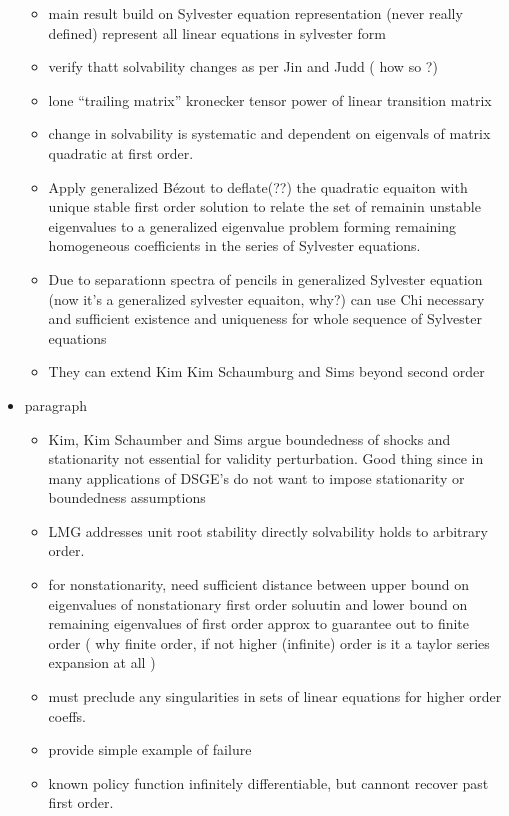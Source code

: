 \documentclass[12pt]{article}
\begin{document}
\begin{itemize}
\begin{itemize}
\item main result build on Sylvester equation representation  (never really defined)  represent all linear equations in sylvester form
\item verify thatt solvability changes  as per Jin and Judd ( how so ?)
\item lone ``trailing matrix'' kronecker tensor power of linear transition matrix
\item change in solvability is  systematic and dependent on eigenvals of matrix quadratic at first order.
\item Apply generalized B\'{e}zout to deflate(??) the quadratic equaiton with unique stable first order solution  to relate the set of remainin unstable eigenvalues to a generalized eigenvalue problem forming remaining homogeneous coefficients in the series of Sylvester equations.
\item Due to separationn spectra of pencils in generalized Sylvester equation  (now it's a generalized sylvester equaiton, why?) can use Chi necessary and sufficient existence and uniqueness for whole sequence of Sylvester equations
\item They can extend Kim Kim  Schaumburg and Sims beyond second order
\end{itemize}
\item paragraph


\begin{itemize}
\item Kim, Kim Schaumber and Sims argue boundedness of shocks and stationarity not essential for validity perturbation. Good thing since in many applications of DSGE's do not want to impose stationarity or boundedness assumptions
\item LMG  addresses unit root stability directly solvability holds to arbitrary order.
\item for nonstationarity, need sufficient distance between upper bound on eigenvalues of nonstationary first order soluutin and lower bound on remaining eigenvalues of first order approx to guarantee out to finite order ( why finite order, if not higher (infinite) 
order is it a taylor series expansion at all )
\item  must preclude any singularities in sets of linear equations for higher order coeffs.
\item provide simple example of failure
\item known policy function infinitely differentiable, but cannont recover past first order.
\end{itemize}


\end{itemize}
\end{document}
